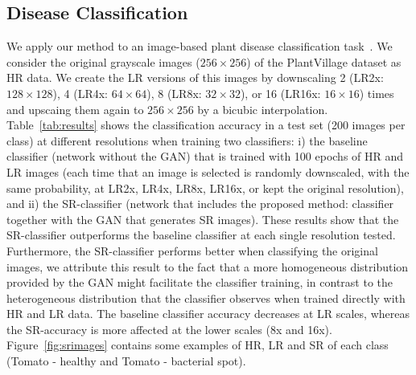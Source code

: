 \documentclass[10pt,twocolumn,letterpaper]{article}
\begin{document}
\subsection{Disease Classification}
We apply our method to an image-based plant disease classification task~\cite{Mohanty2016}. We consider the original grayscale images ($256\times 256$) of the PlantVillage dataset as HR data. We create the LR versions of this images by downscaling 2 (LR2x: $128\times 128$), 4 (LR4x: $64\times 64$), 8 (LR8x: $32\times 32$), or 16 (LR16x: $16\times 16$) times and upscaing them again to $256\times 256$ by a bicubic interpolation. Table~\ref{tab:results} shows the classification accuracy in a test set (200 images per class) at different resolutions when training two classifiers: i) the baseline classifier (network without the GAN) that is trained with 100 epochs of HR and LR images (each time that an image is selected is randomly downscaled, with the same probability, at LR2x, LR4x, LR8x, LR16x, or kept the original resolution), and ii) the SR-classifier (network that includes the proposed method: classifier together with the GAN that generates SR images). These results show that the SR-classifier outperforms the baseline classifier at each single resolution tested. Furthermore, the SR-classifier performs better when classifying the original images, we attribute this result to the fact that a more homogeneous distribution provided by the GAN might facilitate the classifier training, in contrast to the heterogeneous distribution that the classifier observes when trained directly with HR and LR data. The baseline classifier accuracy decreases at LR scales, whereas the SR-accuracy is more affected at the lower scales (8x and 16x). Figure~\ref{fig:srimages} contains some examples of HR, LR and SR of each class (Tomato - healthy and Tomato - bacterial spot).

\end{document}
